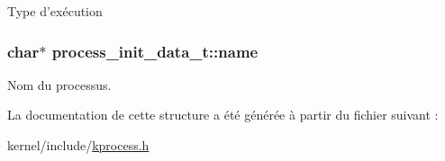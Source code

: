 Type d'exécution \hypertarget{structprocess__init__data__t_a6bdcab0bceaafa6e65a236904fb5a157}{
\subsubsection[{name}]{\setlength{\rightskip}{0pt plus 5cm}char$\ast$ process\-\_\-init\-\_\-data\-\_\-t\-::name}}\label{structprocess__init__data__t_a6bdcab0bceaafa6e65a236904fb5a157}
Nom du processus. 

La documentation de cette structure a été générée à partir du fichier suivant \-:\begin{DoxyCompactItemize}
\item 
kernel/include/\hyperlink{kprocess_8h}{kprocess.\-h}\end{DoxyCompactItemize}

